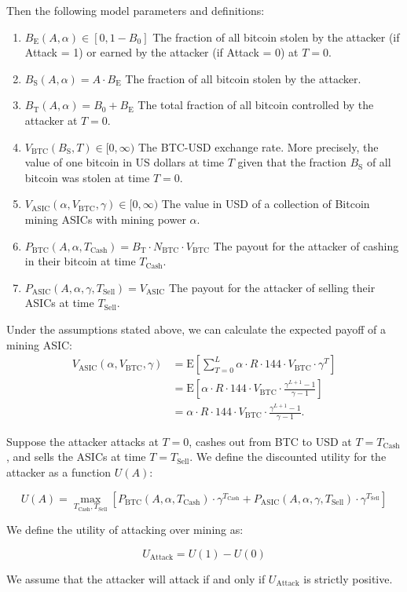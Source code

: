 \documentclass[12pt]{article}
\newcommand*{\Attack}{A}
\newcommand*{\Time}{T}
\newcommand*{\ABtcOrig}{{B_0}}
\newcommand*{\ABtcEarned}{{B_{\mathrm{E}}}}
\newcommand*{\ABtcStolen}{{B_{\mathrm{S}}}}
\newcommand*{\ABtcTotal}{{B_{\mathrm{T}}}}
\newcommand*{\NumBtc}{{N_{\mathrm{BTC}}}}
\newcommand*{\BlkReward}{{R}}
\newcommand*{\ExchgRate}{{V_{\mathrm{BTC}}}}
\newcommand*{\AsicValue}{{V_{\mathrm{ASIC}}}}
\newcommand*{\TimeCashOut}{{T_{\mathrm{Cash}}}}
\newcommand*{\TimeSellAsics}{{T_{\mathrm{Sell}}}}
\newcommand*{\Utility}{U}
\newcommand*{\AttackUtility}{{U_{\mathrm{Attack}}}}
\newcommand*{\PayoffBtc}{{P_{\mathrm{BTC}}}}
\newcommand*{\PayoffAsic}{{P_{\mathrm{ASIC}}}}
\newcommand*{\E}[1]{\mathrm{E}\left[#1\right]}
\newenvironment{defs}
  { \begin{enumerate}[labelindent=0pt,labelwidth=2.5in,itemindent=0em,align=parleft,leftmargin=!] }
  { \end{enumerate} }
\begin{document}
Then the following model parameters and definitions:

\begin{defs}
  \item[{$\ABtcEarned(\Attack, \alpha) \in [0, 1 - B_0]$}]
    The fraction of all bitcoin stolen by the attacker (if Attack = 1) or
    earned by the attacker (if Attack = 0) at $\Time = 0$.
  \item[{$\ABtcStolen(\Attack, \alpha)
      = \Attack \cdot \ABtcEarned$}]
    The fraction of all bitcoin stolen by the attacker.
  \item[{$\ABtcTotal(\Attack, \alpha)
      = \ABtcOrig + \ABtcEarned$}]
    The total fraction of all bitcoin controlled by the attacker at $\Time = 0$.
  \item[{$\ExchgRate(\ABtcStolen, \Time) \in [0, \infty)$}]
    The BTC-USD exchange rate. More precisely, the value of one bitcoin in US
    dollars at time $\Time$ given that the fraction $\ABtcStolen$ of all
    bitcoin was stolen at time $\Time = 0$.
  \item[{$\AsicValue(\alpha, \ExchgRate, \gamma) \in [0, \infty)$}]
    The value in USD of a collection of Bitcoin mining ASICs with mining power $\alpha$.
  \item[{$\PayoffBtc(\Attack, \alpha, \TimeCashOut)
      = \ABtcTotal \cdot \NumBtc \cdot \ExchgRate$}]
    The payout for the attacker of cashing in their bitcoin at time $\TimeCashOut$.
  \item[{$\PayoffAsic(\Attack, \alpha, \gamma, \TimeSellAsics)
      = \AsicValue$}]
    The payout for the attacker of selling their ASICs at time $\TimeSellAsics$.
\end{defs}

Under the assumptions stated above, we can calculate the expected payoff of a mining ASIC:
\begin{align*}
  \AsicValue(\alpha, \ExchgRate, \gamma)
  & = \E{\sum_{\Time=0}^L \alpha \cdot \BlkReward \cdot 144 \cdot \ExchgRate \cdot \gamma^\Time} \\
  & = \E{\alpha \cdot \BlkReward \cdot 144 \cdot \ExchgRate \cdot \frac{\gamma^{L+1} - 1}{\gamma - 1}} \\
  & = \alpha \cdot \BlkReward \cdot 144 \cdot \ExchgRate \cdot \frac{\gamma^{L+1} - 1}{\gamma - 1}.
\end{align*}

Suppose the attacker attacks at $\Time = 0$, cashes out from BTC to USD at
$\Time = \TimeCashOut$, and sells the ASICs at time $\Time = \TimeSellAsics$.
We define the discounted utility for the attacker as a function
$\Utility(\Attack)$:

\[
  \Utility(\Attack) =
  \max_{\TimeCashOut, \TimeSellAsics}
    \left[
        \PayoffBtc(\Attack, \alpha, \TimeCashOut)
          \cdot \gamma^\TimeCashOut
        + \PayoffAsic(\Attack, \alpha, \gamma, \TimeSellAsics)
          \cdot \gamma^\TimeSellAsics
    \right]
\]

We define the utility of attacking over mining as:

\[
  \AttackUtility = \Utility(1) - \Utility(0)
\]

We assume that the attacker will attack if and only if $\AttackUtility$ is
strictly positive.
\end{document}
